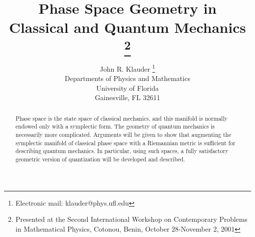 \def\one{1\hskip-.37em 1}
\def\ir{{\rm I}\hskip-.2em{\rm R}}
\def\half{\textstyle{\frac{1}{2}}}
\def\quarter{\textstyle{\frac{1}{4}}}
\def\halfnu{\textstyle{\frac{1}{2\nu}}}
\def\iN{{\rm I}\hskip-.2em{\rm N}}
\def\irtwo{{\rm I}\hskip-.2em{\rm R}^2}
\def\irn{{\rm I}\hskip-.2em{\rm R}^n}
\def\iH{{\rm I}\hskip-.2em{\rm H}}
\def\H{{\cal H}}
\def\D{{\cal D}}
\def\De{\Delta}
\def\tr{{\rm tr}}
\def\E{{\rm I}\hskip-.2em{\rm E}}
\def\ra{\rightarrow}
\def\tint{{\textstyle\int}}
\def\hg{{\hat g}}
\def\hp{{\hat\pi}}
\def\hph{{\hat\phi}}
\def\s{\hskip.08em}
\def\d{\partial}
\def\o{\overline}
\def\a{\alpha}
\def\b{\begin{eqnarray*}}     %
\def\e{\end{eqnarray*}}       %
\def\bn{\begin{eqnarray}}     %
\def\en{\end{eqnarray}}       %
\def\<{\langle}
\def\>{\rangle}
\def\dn{d^{n}\!x}
\def\no{\nonumber}
\def\ds{d^{s}\!x}
\def\dny{d^{n}\!y}
\def\dsy{d^{s}\!y}
\def\{{\lbrace}
\def\}{\rbrace}


\title{Phase Space Geometry in \\Classical and Quantum Mechanics
\footnote{Presented at the Second International Workshop on Contemporary 
Problems in Mathematical Physics, Cotonou, Benin, October 28-November 2,
2001}}
\author{John R. Klauder
\footnote{Electronic mail: klauder@phys.ufl.edu}\\
Departments of Physics and Mathematics\\
University of Florida\\
Gainesville, FL  32611}
\date{}     %
\maketitle
\begin{abstract}
Phase space is the state space of classical mechanics, and this manifold 
is normally endowed only with a symplectic form. The geometry of quantum 
mechanics is necessarily more complicated. Arguments will be given to 
show that augmenting the symplectic manifold of classical phase space 
with a Riemannian metric is sufficient for describing quantum mechanics. 
In particular, using such spaces, a fully satisfactory geometric version 
of quantization will be developed and described.
\end{abstract}
